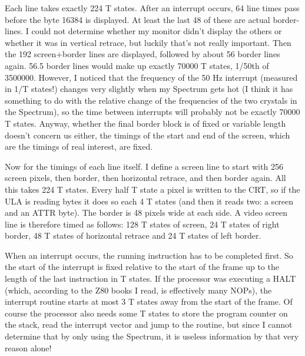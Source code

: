     Each line takes exactly 224 T states.  After an interrupt occurs, 64
    line times pass before the byte 16384 is displayed.  At least the last
    48 of these are actual border-lines.  I could not determine whether my
    monitor didn't display the others or whether it was in vertical retrace,
    but luckily that's not really important.  Then the 192 screen+border
    lines are displayed, followed by about 56 border lines again.  56.5
    border lines would make up exactly 70000 T states, 1/50th of 3500000.
    However, I noticed that the frequency of the 50 Hz interrupt (measured
    in 1/T states!) changes very slightly when my Spectrum gets hot (I think
    it has something to do with the relative change of the frequencies of
    the two crystals in the Spectrum), so the time between interrupts will
    probably not be exactly 70000 T states. Anyway, whether the final border
    block is of fixed or variable length doesn't concern us either, the
    timings of the start and end of the screen, which are the timings of
    real interest, are fixed.

    Now for the timings of each line itself.  I define a screen line to
    start with 256 screen pixels, then border, then horizontal retrace, and
    then border again.  All this takes 224 T states.  Every half T state a
    pixel is written to the CRT, so if the ULA is reading bytes it does so
    each 4 T states (and then it reads two: a screen and an ATTR byte).  The
    border is 48 pixels wide at each side.  A video screen line is therefore
    timed as follows: 128 T states of screen, 24 T states of right border,
    48 T states of horizontal retrace and 24 T states of left border.

    When an interrupt occurs, the running instruction has to be completed
    first.  So the start of the interrupt is fixed relative to the start of
    the frame up to the length of the last instruction in T states.  If the
    processor was executing a HALT (which, according to the Z80 books I
    read, is effectively many NOPs), the interrupt routine starts at most 3
    T states away from the start of the frame.  Of course the processor also
    needs some T states to store the program counter on the stack, read the
    interrupt vector and jump to the routine, but since I cannot determine
    that by only using the Spectrum, it is useless information by that very
    reason alone!

